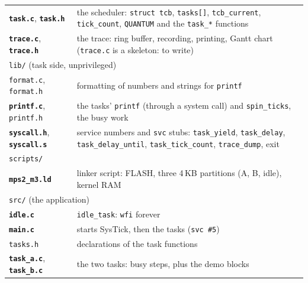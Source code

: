 \begin{center}
\begin{tabular}{l p{11.2cm}}
        \textbf{\texttt{task.c}}, \textbf{\texttt{task.h}} & the scheduler: \texttt{struct tcb}, \texttt{tasks[]}, \texttt{tcb\_current}, \texttt{tick\_count}, \texttt{QUANTUM} and the \texttt{task\_*} functions \\
        \textbf{\texttt{trace.c}}, \textbf{\texttt{trace.h}} & the trace: ring buffer, recording, printing, Gantt chart (\texttt{trace.c} is a skeleton: to write) \\
        \hline
        \multicolumn{2}{l}{\texttt{lib/} (task side, unprivileged)} \\
        \texttt{format.c}, \texttt{format.h} & formatting of numbers and strings for \texttt{printf} \\
        \textbf{\texttt{printf.c}}, \texttt{printf.h} & the tasks' \texttt{printf} (through a system call) and \texttt{spin\_ticks}, the busy work \\
        \textbf{\texttt{syscall.h}}, \textbf{\texttt{syscall.s}} & service numbers and \texttt{svc} stubs: \texttt{task\_yield}, \texttt{task\_delay}, \texttt{task\_delay\_until}, \texttt{task\_tick\_count}, \texttt{trace\_dump}, exit \\
        \hline
        \multicolumn{2}{l}{\texttt{scripts/}} \\
        \textbf{\texttt{mps2\_m3.ld}} & linker script: FLASH, three 4\,KB partitions (A, B, idle), kernel RAM \\
        \hline
        \multicolumn{2}{l}{\texttt{src/} (the application)} \\
        \textbf{\texttt{idle.c}} & \texttt{idle\_task}: \texttt{wfi} forever \\
        \textbf{\texttt{main.c}} & starts SysTick, then the tasks (\texttt{svc \#5}) \\
        \texttt{tasks.h} & declarations of the task functions \\
        \textbf{\texttt{task\_a.c}}, \textbf{\texttt{task\_b.c}} & the two tasks: busy steps, plus the demo blocks \\
        \hline
    \end{tabular}
\end{center}

